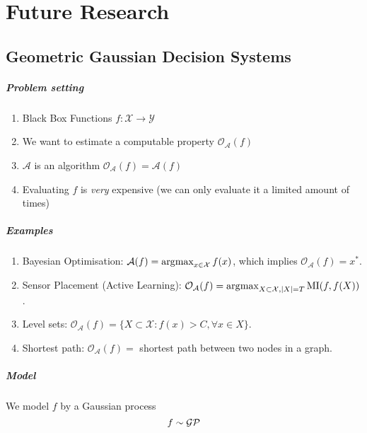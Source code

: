 \chapter{Future Research}

\section{Geometric Gaussian Decision Systems}

\paragraph{Problem setting}

\begin{enumerate}
    \item Black Box Functions $f: \mathcal{X} \rightarrow \mathcal{Y}$
    \item We want to estimate a computable property $\mathcal{O}_\mathcal{A}(f)$
    \item $\mathcal{A}$ is an algorithm $\mathcal{O}_\mathcal{A}(f) = \mathcal{A}(f)$
    \item Evaluating $f$ is \emph{very} expensive (we can only evaluate it a limited amount of times)
\end{enumerate}

\paragraph{Examples}
\begin{enumerate}
    \item Bayesian Optimisation: $\mathcal{A}(f) = \operatorname*{\arg\!\max}_{x\in\mathcal{X}} f(x)$, which implies $\mathcal{O}_\mathcal{A}(f) = x^*$.
    \item Sensor Placement (Active Learning): $\mathcal{O}_\mathcal{A}(f) = \operatorname*{\arg\!\max}_{X \subset \mathcal{X}, |X| = T} \textrm{MI}(f, f(X))$.
    \item Level sets: $\mathcal{O}_\mathcal{A}(f) = \{X \subset \mathcal{X}: f(x) > C, \forall x \in X\}$.
    \item Shortest path: $\mathcal{O}_\mathcal{A}(f) = $ shortest path between two nodes in a graph.
\end{enumerate}

\paragraph{Model}

We model $f$ by a Gaussian process
\begin{equation}
    f \sim \mathcal{GP}
\end{equation}

